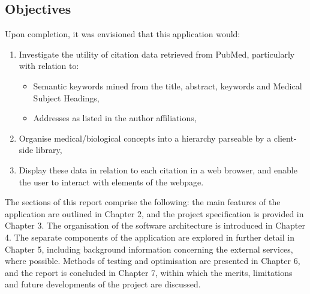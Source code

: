 \documentclass[Report.tex]{subfiles}
\begin{document}
\subsection{Objectives}
Upon completion, it was envisioned that this application would:

\begin{enumerate}
\item Investigate the utility of citation data retrieved from PubMed, particularly with relation to:
	\begin{itemize}
	\item Semantic keywords mined from the title, abstract, keywords and Medical Subject Headings,
	\item Addresses as listed in the author affiliations,
	\end{itemize}
\item Organise medical/biological concepts into a hierarchy parseable by a client-side library,
\item Display these data in relation to each citation in a web browser, and enable the user to interact with elements of the webpage.
\end{enumerate}

The sections of this report comprise the following: the main features of the application are outlined in Chapter 2, and the project specification is provided in Chapter 3. The organisation of the software architecture is introduced in Chapter 4. The separate components of the application are explored in further detail in Chapter 5, including background information concerning the external services, where possible. Methods of testing and optimisation are presented in Chapter 6, and the report is concluded in Chapter 7, within which the merits, limitations and future developments of the project are discussed.
\end{document}
